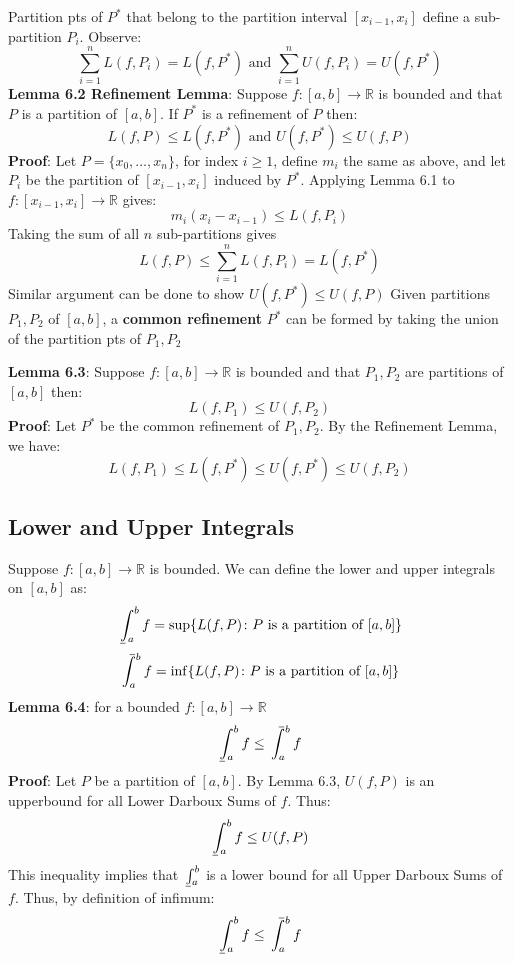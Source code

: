 \documentclass{article}
\def\upint{\mathchoice%
    {\mkern13mu\overline{\vphantom{\intop}\mkern7mu}\mkern-20mu}%
    {\mkern7mu\overline{\vphantom{\intop}\mkern7mu}\mkern-14mu}%
    {\mkern7mu\overline{\vphantom{\intop}\mkern7mu}\mkern-14mu}%
    {\mkern7mu\overline{\vphantom{\intop}\mkern7mu}\mkern-14mu}%
  \int}
\def\lowint{\mkern3mu\underline{\vphantom{\intop}\mkern7mu}\mkern-10mu\int}
\begin{document}
  Partition pts of $P^*$ that belong to the partition interval $[x_{i-1}, x_i]$ define a sub-partition $P_i$. Observe:
  \[\sum_{i=1}^{n}L(f, P_i) = L(f, P^*) \text{ and } \sum_{i = 1}^{n}U(f, P_i) = U(f, P^*)\]
  \textbf{Lemma 6.2 Refinement Lemma}: Suppose $f \colon [a, b] \rightarrow \mathbb{R}$ is bounded and that $P$ is a partition of $[a, b]$. If $P^*$ is a refinement of $P$ then:
  \[L(f, P) \leq L(f, P^*) \text{ and } U(f, P^*) \leq U(f, P)\]
  \textbf{Proof}: Let $P = \{x_0, \ldots, x_n\}$, for index $i \geq 1$, define $m_i$ the same as above, and let $P_i$ be the partition of $[x_{i-1}, x_i]$ induced by $P^*$. Applying Lemma 6.1 to $f \colon [x_{i-1}, x_i] \rightarrow \mathbb{R}$ gives:
  \[m_i(x_i - x_{i-1}) \leq L(f, P_i)\]
  Taking the sum of all $n$ sub-partitions gives
  \[L(f, P) \leq \sum_{i = 1}^{n}L(f, P_i) = L(f, P^*)\]
  Similar argument can be done to show $U(f, P^*) \leq U(f,P)$ \newline \newline
  Given partitions $P_1, P_2$ of $[a,b]$, a \textbf{common refinement} $P^*$ can be formed by taking the union of the partition pts of $P_1, P_2$

  \textbf{Lemma 6.3}: Suppose $f \colon [a, b] \rightarrow \mathbb{R}$ is bounded and that $P_1, P_2$ are partitions of $[a, b]$ then:
  \[L(f, P_1) \leq U(f, P_2)\]
  \textbf{Proof}: Let $P^*$ be the common refinement of $P_1, P_2$. By the Refinement Lemma, we have:
  \[L(f, P_1) \leq L(f, P^*) \leq U(f, P^*) \leq U(f, P_2)\]
  \subsection{Lower and Upper Integrals}
  Suppose $f \colon [a, b] \rightarrow \mathbb{R}$ is bounded. We can define the lower and upper integrals on $[a,b]$ as:
  \[\lowint_{a}^{b}f = \sup\{L(f, P) \colon P \text{ is a partition of } [a,b]\}\]
  \[\upint_{a}^{b}f = \inf\{L(f, P) \colon P \text{ is a partition of } [a,b]\}\]
  \textbf{Lemma 6.4}: for a bounded $f \colon [a, b] \rightarrow \mathbb{R}$
  \[\lowint_{a}^{b}f \leq \upint_{a}^{b}f\]
  \textbf{Proof}: Let $P$ be a partition of $[a, b]$. By Lemma 6.3, $U(f, P)$ is an upperbound for all Lower Darboux Sums of $f$. Thus:
  \[\lowint_{a}^{b}f \leq U(f, P)\]
  This inequality implies that $\lowint_{a}^{b}$ is a lower bound for all Upper Darboux Sums of $f$. Thus, by definition of infimum:
  \[\lowint_{a}^{b}f \leq \upint_{a}^{b}f\]
\end{document}
